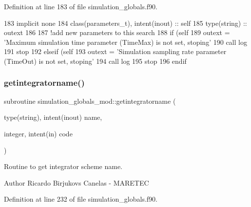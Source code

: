 Definition at line 183 of file simulation\+\_\+globals.\+f90.


\begin{DoxyCode}
183     \textcolor{keywordtype}{implicit none}
184     \textcolor{keywordtype}{class}(parameters\_t), \textcolor{keywordtype}{intent(inout)} :: self
185     \textcolor{keywordtype}{type}(string) :: outext
186 
187     \textcolor{comment}{!add new parameters to this search}
188     \textcolor{keywordflow}{if} (self%
189         outext = \textcolor{stringliteral}{'Maximum simulation time parameter (TimeMax) is not set, stoping'}
190         \textcolor{keyword}{call }log%
191         stop
192     \textcolor{keywordflow}{elseif} (self%
193         outext = \textcolor{stringliteral}{'Simulation sampling rate parameter (TimeOut) is not set, stoping'}
194         \textcolor{keyword}{call }log%
195         stop
196 \textcolor{keywordflow}{    endif}
\end{DoxyCode}
\mbox{\label{namespacesimulation__globals__mod_a68e871ed8e5d3930884e968c6fdafddc}} 
\subsubsection{\texorpdfstring{getintegratorname()}{getintegratorname()}}
{\footnotesize\ttfamily subroutine simulation\+\_\+globals\+\_\+mod\+::getintegratorname (\begin{DoxyParamCaption}\item[{type(string), intent(inout)}]{name,  }\item[{integer, intent(in)}]{code }\end{DoxyParamCaption})\hspace{0.3cm}{\ttfamily [private]}}



Routine to get integrator scheme name. 

\begin{DoxyAuthor}{Author}
Ricardo Birjukovs Canelas -\/ M\+A\+R\+E\+T\+EC 
\end{DoxyAuthor}


Definition at line 232 of file simulation\+\_\+globals.\+f90.


